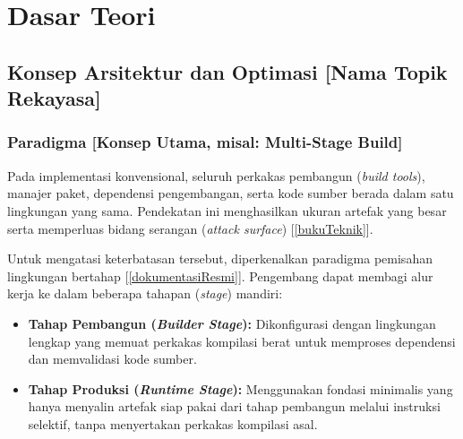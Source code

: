 %

\chapter{Dasar Teori}
\label{chap:dasarteori}

\section{Konsep Arsitektur dan Optimasi [Nama Topik Rekayasa]}

\subsection{Paradigma [Konsep Utama, misal: Multi-Stage Build]}
Pada implementasi konvensional, seluruh perkakas pembangun (\textit{build tools}), manajer paket, dependensi pengembangan, serta kode sumber berada dalam satu lingkungan yang sama. Pendekatan ini menghasilkan ukuran artefak yang besar serta memperluas bidang serangan (\textit{attack surface}) [\ref{bukuTeknik}].

Untuk mengatasi keterbatasan tersebut, diperkenalkan paradigma pemisahan lingkungan bertahap [\ref{dokumentasiResmi}]. Pengembang dapat membagi alur kerja ke dalam beberapa tahapan (\textit{stage}) mandiri:
\begin{itemize}
    \item \textbf{Tahap Pembangun (\textit{Builder Stage}):} Dikonfigurasi dengan lingkungan lengkap yang memuat perkakas kompilasi berat untuk memproses dependensi dan memvalidasi kode sumber.
    \item \textbf{Tahap Produksi (\textit{Runtime Stage}):} Menggunakan fondasi minimalis yang hanya menyalin artefak siap pakai dari tahap pembangun melalui instruksi selektif, tanpa menyertakan perkakas kompilasi asal.
\end{itemize}

